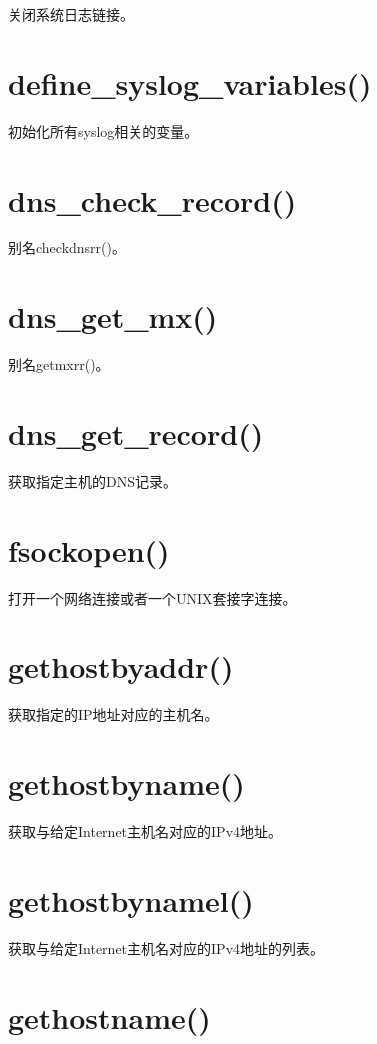 关闭系统日志链接。

\section{define\_syslog\_variables()}

初始化所有syslog相关的变量。

\section{dns\_check\_record()}

别名checkdnsrr()。

\section{dns\_get\_mx()}

别名getmxrr()。

\section{dns\_get\_record()}

获取指定主机的DNS记录。

\section{fsockopen()}

打开一个网络连接或者一个UNIX套接字连接。

\section{gethostbyaddr()}

获取指定的IP地址对应的主机名。

\section{gethostbyname()}

获取与给定Internet主机名对应的IPv4地址。

\section{gethostbynamel()}

获取与给定Internet主机名对应的IPv4地址的列表。

\section{gethostname()}

